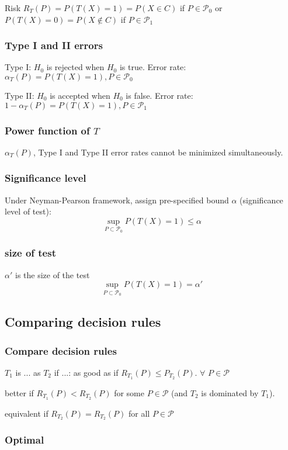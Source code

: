 Risk $R_T(P) = P(T(X)=1)=P(X\in C)$ if $P\in\mathcal{P}_0$ or $P(T(X)=0)=P(X\notin C)$ if $P\in\mathcal{P}_1$

\subsubsection{Type I and II errors}
Type I: $H_0$ is rejected when $H_0$ is true.
Error rate: $\alpha_T(P) = P(T(X)=1), P\in\mathcal{P}_0$

Type II: $H_0$ is accepted when $H_0$ is false.
Error rate: $1 - \alpha_T(P) = P(T(X)=1), P\in\mathcal{P}_1$

\subsubsection{Power function of $T$}
$\alpha_T(P)$, Type I and Type II error rates cannot be minimized simultaneously.

\subsubsection{Significance level}
Under Neyman-Pearson framework, assign pre-specified bound $\alpha$ (significance level of test):
$$
\sup_{P\subset \mathcal{P}_0} P(T(X)=1) \leq \alpha
$$

\subsubsection{size of test}
$\alpha'$ is the size of the test
$$
\sup_{P\subset \mathcal{P}_0} P(T(X)=1) = \alpha'
$$

\subsection{Comparing decision rules}

\subsubsection{Compare decision rules}

$T_1$ is ... as $T_2$ if ...:
as good as if $R_{T_1}(P) \leq P_{T_2}(P)$. $\forall$ $P\in\mathcal{P}$

better if $R_{T_1}(P) < R_{T_2}(P)$ for some $P\in\mathcal{P}$ (and $T_2$ is dominated by $T_1$).

equivalent if $R_{T_2}(P) = R_{T_2}(P)$ for all $P\in\mathcal{P}$

\subsubsection{Optimal}

